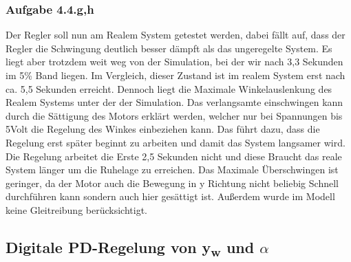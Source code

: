 \documentclass[10pt]{scrartcl}
\begin{document}
\subsubsection{Aufgabe 4.4.g,h}	
Der Regler soll nun am Realem System getestet werden, dabei fällt auf, dass
der Regler die Schwingung deutlich besser  dämpft  als das ungeregelte System. Es liegt aber trotzdem weit weg von der Simulation, bei der wir nach 3,3 Sekunden im 5\% Band liegen. Im Vergleich, dieser Zustand ist im realem System erst nach ca. 5,5 Sekunden erreicht. Dennoch liegt die Maximale Winkelauslenkung des Realem Systems unter der der Simulation. Das verlangsamte einschwingen kann durch die Sättigung des Motors erklärt werden, welcher nur bei Spannungen bis 5Volt die Regelung des Winkes einbeziehen kann. Das führt dazu, dass die Regelung erst später beginnt zu arbeiten und damit das System langsamer wird. Die Regelung arbeitet die Erste 2,5 Sekunden nicht und diese Braucht das reale System länger um die Ruhelage zu erreichen. Das Maximale Überschwingen ist geringer, da der Motor auch die Bewegung in y Richtung nicht beliebig Schnell durchführen kann sondern auch hier gesättigt ist. Außerdem wurde im Modell keine Gleitreibung berücksichtigt.\\
\subsection{Digitale PD-Regelung von  y\textsubscript{w} und $\alpha$}
\end{document}
